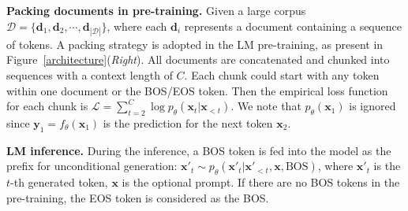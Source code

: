 

\textbf{Packing documents in pre-training.} Given a large corpus $\mathcal{D}=\{\boldsymbol{d}_1\textrm{,}\,\boldsymbol{d}_2\textrm{,}\,\cdots\textrm{,}\,\boldsymbol{d}_{|\mathcal{D}|}\}$, where each $\boldsymbol{d}_i$ represents a document containing a sequence of tokens. A packing strategy is adopted in the LM pre-training, as present in Figure~\ref{architecture}(\emph{Right}). All documents are concatenated and chunked into sequences with a context length of $C$. Each chunk could start with any token within one document or the BOS/EOS token. Then the empirical loss function for each chunk is $\mathcal{L}=\sum_{t=2}^C\log p_{\theta}(\boldsymbol{x}_t|\boldsymbol{x}_{<t})$. We note that $p_{\theta}(\boldsymbol{x}_1)$ is ignored since $\boldsymbol{y}_1=f_{\theta}(\boldsymbol{x}_1)$ is the prediction for the next token $\boldsymbol{x}_2$.




\textbf{LM inference.} During the inference, a BOS token is fed into the model as the prefix for unconditional generation: $\boldsymbol{x}'_t\sim p_{\theta}(\boldsymbol{x}'_t|\boldsymbol{x}'_{<t}\textrm{,}\,\boldsymbol{x}\textrm{,}\,\textrm{BOS})$, where $\boldsymbol{x}'_t$ is the $t$-th generated token, $\boldsymbol{x}$ is the optional prompt. If there are no BOS tokens in the pre-training, the EOS token is considered as the BOS.





